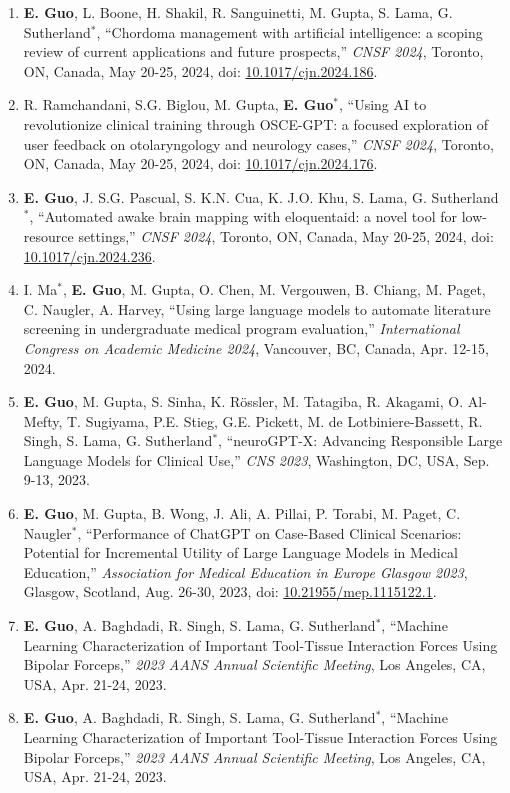 \documentclass{article}
\begin{document}
\begin{enumerate}
    \item \textbf{E. Guo}, L. Boone, H. Shakil, R. Sanguinetti, M. Gupta, S. Lama, G. Sutherland$^*$, ``Chordoma management with artificial intelligence: a scoping review of current applications and future prospects,'' \textit{CNSF 2024}, Toronto, ON, Canada, May 20-25, 2024, doi: \href{https://doi.org/10.1017/cjn.2024.186}{10.1017/cjn.2024.186}.
    \item R. Ramchandani, S.G. Biglou, M. Gupta, \textbf{E. Guo}$^*$, ``Using AI to revolutionize clinical training through OSCE-GPT: a focused exploration of user feedback on otolaryngology and neurology cases,'' \textit{CNSF 2024}, Toronto, ON, Canada, May 20-25, 2024, doi: \href{https://doi.org/10.1017/cjn.2024.176}{10.1017/cjn.2024.176}.
    \item \textbf{E. Guo}, J. S.G. Pascual, S. K.N. Cua, K. J.O. Khu, S. Lama, G. Sutherland$^*$, ``Automated awake brain mapping with eloquentaid: a novel tool for low-resource settings,'' \textit{CNSF 2024}, Toronto, ON, Canada, May 20-25, 2024, doi: \href{https://doi.org/10.1017/cjn.2024.236}{10.1017/cjn.2024.236}.
    \item I. Ma$^*$, \textbf{E. Guo}, M. Gupta, O. Chen, M. Vergouwen, B. Chiang, M. Paget, C. Naugler, A. Harvey, ``Using large language models to automate literature screening in undergraduate medical program evaluation,'' \textit{International Congress on Academic Medicine 2024}, Vancouver, BC, Canada, Apr. 12-15, 2024.
    \item \textbf{E. Guo}, M. Gupta, S. Sinha, K. R\"ossler, M. Tatagiba, R. Akagami, O. Al-Mefty, T. Sugiyama, P.E. Stieg, G.E. Pickett, M. de Lotbiniere-Bassett, R. Singh, S. Lama, G. Sutherland$^*$, ``neuroGPT-X: Advancing Responsible Large Language Models for Clinical Use,'' \textit{CNS 2023}, Washington, DC, USA, Sep. 9-13, 2023.
    \item \textbf{E. Guo}, M. Gupta, B. Wong, J. Ali, A. Pillai, P. Torabi, M. Paget, C. Naugler$^*$, ``Performance of ChatGPT on Case-Based Clinical Scenarios: Potential for Incremental Utility of Large Language Models in Medical Education,'' \textit{Association for Medical Education in Europe Glasgow 2023}, Glasgow, Scotland, Aug. 26-30, 2023, doi: \href{https://doi.org/10.21955/mep.1115122.1}{10.21955/mep.1115122.1}.
    \item \textbf{E. Guo}, A. Baghdadi, R. Singh, S. Lama, G. Sutherland$^*$, ``Machine Learning Characterization of Important Tool-Tissue Interaction Forces Using Bipolar Forceps,'' \textit{2023 AANS Annual Scientific Meeting}, Los Angeles, CA, USA, Apr. 21-24, 2023.
    \item \textbf{E. Guo}, A. Baghdadi, R. Singh, S. Lama, G. Sutherland$^*$, ``Machine Learning Characterization of Important Tool-Tissue Interaction Forces Using Bipolar Forceps,'' \textit{2023 AANS Annual Scientific Meeting}, Los Angeles, CA, USA, Apr. 21-24, 2023.
\end{enumerate}
\end{document}
